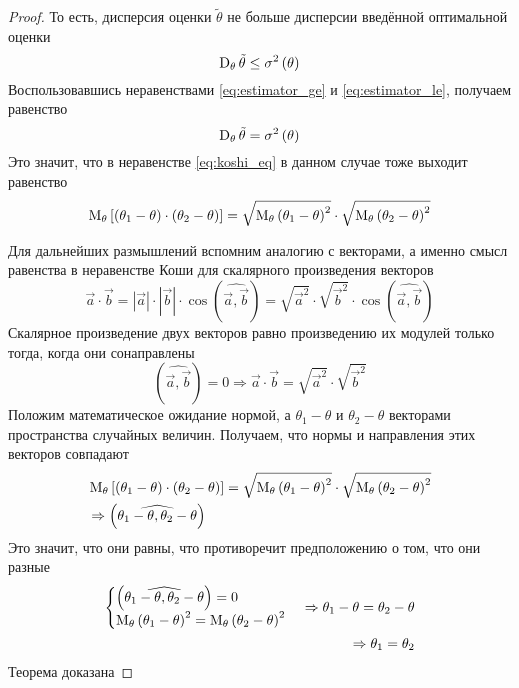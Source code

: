 \begin{proof}
  То есть, дисперсия оценки $\tilde{\theta}$ не больше дисперсии
  введённой оптимальной оценки
  \begin{equation}\label{eq:estimator_le}
    \operatorname{D}_{\theta} \tilde{\theta}\le\sigma^2\left(\theta\right)
  \end{equation}
  Воспользовавшись неравенствами
  \eqref{eq:estimator_ge} и \eqref{eq:estimator_le}, получаем равенство
  $$\operatorname{D}_{\theta} \tilde{\theta}= \sigma^2\left(\theta\right)$$
  Это значит, что в неравенстве \eqref{eq:koshi_eq}
  в данном случае тоже выходит равенство
  $$\operatorname{M}_{\theta} \left[ \left( \theta_1-\theta \right)
      \cdot \left( \theta_2-\theta \right) \right]
    = \sqrt{\operatorname{M}_{\theta} \left( \theta_1-\theta \right)^2}
      \cdot \sqrt{\operatorname{M}_{\theta} \left( \theta_2-\theta \right)^2}$$

  Для дальнейших размышлений вспомним аналогию с векторами,
  а именно смысл равенства в неравенстве Коши
  для скалярного произведения векторов
  $$\vec{a}\cdot \vec{b}
    = \left|\vec{a}\right|\cdot \left|\vec{b}\right|
      \cdot \cos{\left(\widehat{\vec{a},\vec{b}}\right)}
    = \sqrt{\vec{a}^2}\cdot \sqrt{\vec{b}^2}
      \cdot \cos{\left(\widehat{\vec{a},\vec{b}}\right)}$$
  Скалярное произведение двух векторов равно произведению их модулей
  только тогда, когда они сонаправлены
  $$\left(\widehat{\vec{a},\vec{b}}\right)=0
    \Rightarrow \vec{a}\cdot \vec{b}
    = \sqrt{\vec{a}^2}\cdot \sqrt{\vec{b}^2}$$
  Положим математическое ожидание нормой,
  а $\theta_1-\theta$ и $\theta_2-\theta$ векторами
  пространства случайных величин.
  Получаем, что нормы и направления этих векторов совпадают
  \begin{align*}
    &\operatorname{M}_{\theta} \left[ \left( \theta_1-\theta \right)
      \cdot \left( \theta_2-\theta \right) \right]
    = \sqrt{\operatorname{M}_{\theta} \left( \theta_1-\theta \right)^2}
      \cdot \sqrt{\operatorname{M}_{\theta} \left( \theta_2-\theta \right)^2}\\
    &\Rightarrow\left(\widehat{\theta_1-\theta,\theta_2-\theta}\right)\\
    \end{align*}
  Это значит, что они равны,
  что противоречит предположению о том, что они разные
  \begin{align*}
    \begin{cases}
      \left(\widehat{\theta_1-\theta,\theta_2-\theta}\right)=0\\
      \operatorname{M}_{\theta} \left( \theta_1-\theta \right)^2
        = \operatorname{M}_{\theta} \left( \theta_2-\theta \right)^2
    \end{cases}
    \Rightarrow \theta_1-\theta= \theta_2-\theta\\
    \Rightarrow\theta_1= \theta_2
  \end{align*}
  Теорема доказана
\end{proof}

